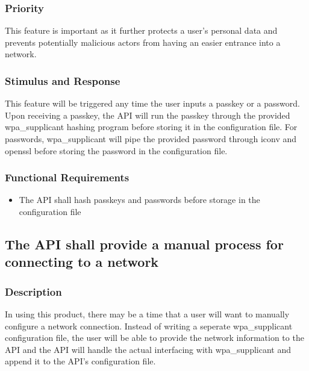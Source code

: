 \subsubsection{Priority}
This feature is important as it further protects a user's personal data and prevents
potentially malicious actors from having an easier entrance into a network.

\subsubsection{Stimulus and Response}
This feature will be triggered any time the user inputs a passkey or a password.
Upon receiving a passkey, the API will run the passkey through the provided 
wpa\_supplicant hashing program before storing it in the configuration file. For
passwords, wpa\_supplicant will pipe the provided password through iconv and openssl
before storing the password in the configuration file.

\subsubsection{Functional Requirements}
\begin{itemize}
  \item The API shall hash passkeys and passwords before storage in the configuration file
\end{itemize}


\subsection{The API shall provide a manual process for connecting to a network}
\subsubsection{Description}
In using this product, there may be a time that a user will want to manually configure
a network connection. Instead of writing a seperate wpa\_supplicant configuration file,
the user will be able to provide the network information to the API and the API will handle
the actual interfacing with wpa\_supplicant and append it to the API's configuration file.

